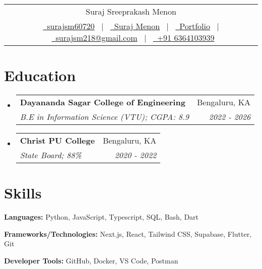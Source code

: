 \documentclass[a4paper,11pt]{article}
\makeatletter
\newcommand{\resumeSubheading}[4]{
  \vspace{1pt}\item
    \begin{tabular*}{0.97\textwidth}{l@{\extracolsep{\fill}}r}
      \textbf{#1} & #2 \\
      \textit{\small#3} & \textit{\small #4} \\
    \end{tabular*}\vspace{-1pt}
}
\newcommand{\resumeSubHeadingListStart}{\begin{itemize}[leftmargin=*, itemsep=3.8pt, parsep=0pt, topsep=4.8pt, partopsep=0pt]}
\newcommand{\resumeSubHeadingListEnd}{\end{itemize}}
\makeatother
\begin{document}
\pagestyle{empty}


\begin{tabularx}{\linewidth}{@{} C @{}}
	\Huge{Suraj Sreeprakash Menon}                                              \\[7pt]
	\href{https://github.com/surajsm60720}{\raisebox{-0.05\height}\faGithub\ surajsm60720} \ $|$ \
	\href{https://www.linkedin.com/in/suraj-menon-a581ab305/}{\raisebox{-0.05\height}\faLinkedin\ Suraj Menon} \ $|$ \
	\href{https://surajmenon.vercel.app}{\raisebox{-0.05\height}\faGlobe \ Portfolio} \ $|$ \ 
	\href{mailto:surajsm218@gmail.com}{\raisebox{-0.05\height}\faEnvelope \ surajsm218@gmail.com} \ $|$ \
	\href{tel:+916364103939}{\raisebox{-0.05\height}\faMobile \ +91 6364103939} \\
\end{tabularx}



\section{Education}
  \resumeSubHeadingListStart
    \resumeSubheading
      {Dayananda Sagar College of Engineering}{Bengaluru, KA}
      {B.E in Information Science (VTU);  CGPA: 8.9}{2022 - 2026}
    \resumeSubheading
      {Christ PU College}{Bengaluru, KA}
      {State Board;  88\%}{2020 - 2022}
  \resumeSubHeadingListEnd



\section{Skills}

\textbf{Languages:} Python, JavaScript, Typescript, SQL, Bash, Dart

\textbf{Frameworks/Technologies:} Next.js, React, Tailwind CSS, Supabase, Flutter, Git

\textbf{Developer Tools:} GitHub, Docker, VS Code, Postman
\end{document}
